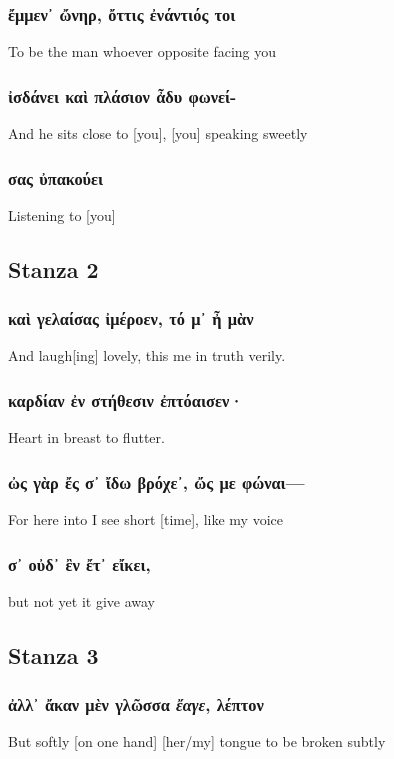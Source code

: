 \subsubsection*{ἔμμεν᾽ ὤνηρ, ὄττις ἐνάντιός τοι}
To be the man whoever opposite facing you

\subsubsection*{ἰσδάνει καὶ πλάσιον ἆδυ φωνεί-}
And he sits close to [you], [you] speaking sweetly

\subsubsection*{σας ὐπακούει}
Listening to [you]

\subsection*{Stanza 2}
\subsubsection*{καὶ γελαίσας ἰμέροεν, τό μ᾽ ἦ μὰν}
And laugh[ing] lovely, this me in truth verily.

\subsubsection*{καρδίαν ἐν στήθεσιν ἐπτόαισεν·}
Heart in breast to flutter.

\subsubsection*{ὠς γὰρ ἔς σ᾽ ἴδω βρόχε᾽, ὤς με φώναι---}
For here into I see short [time], like my voice

\subsubsection*{σ᾽ οὐδ᾽ ἒν ἔτ᾽ εἴκει,}

but not yet it give away

\subsection*{Stanza 3}
\subsubsection*{ἀλλ᾽ ἄκαν μὲν γλῶσσα \emph{ἔαγε}, λέπτον}
But softly [on one hand] [her/my] tongue to be broken subtly

